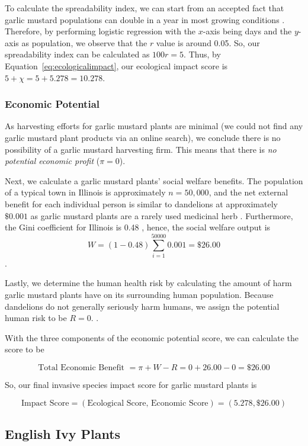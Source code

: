 To calculate the spreadability index, we can start from an accepted fact that garlic mustard populations can double in a year in most growing conditions \cite{fmrInvasiveSpecies}. Therefore, by performing logistic regression with the $x$-axis being days and the \(y\)-axis as population, we observe that the \(r\) value is around 0.05. So, our spreadability index can be calculated as \(100r = 5\). Thus, by Equation~\ref{eq:ecologicalimpact}, our ecological impact score is \(5 + \chi = 5 + 5.278 = 10.278\).

\subsubsection{Economic Potential}

As harvesting efforts for garlic mustard plants are minimal (we could not find any garlic mustard plant products via an online search), we conclude there is no possibility of a garlic mustard harvesting firm. This means that there is \textit{no potential economic profit} (\(\pi = 0\)).

Next, we calculate a garlic mustard plants' social welfare benefits. The population of a typical town in Illinois is approximately \(n = 50,000\), and the net external benefit for each individual person is similar to dandelions at approximately \(\$0.001\) as garlic mustard plants are a rarely used medicinal herb \cite{fmrInvasiveSpecies}. Furthermore, the Gini coefficient for Illinois is 0.48 \cite{247wallstIncomeInequality}, hence, the social welfare output is \[W = (1- 0.48) \sum_{i = 1}^{50000} 0.001 = \$26.00\].

Lastly, we determine the human health risk by calculating the amount of harm garlic mustard plants have on its surrounding human population. Because dandelions do not generally seriously harm humans, we assign the potential human risk to be \(R = 0\).
\cite{fmrInvasiveSpecies}.

With the three components of the economic potential score, we can calculate the score to be 

\[\text{Total Economic Benefit } = \pi + W - R = 0 + 26.00 - 0 = \$26.00\]

So, our final invasive species impact score for garlic mustard plants is

\[\text{Impact Score} = (\text{Ecological Score, Economic Score}) = (5.278, \$26.00)\]

\subsection{English Ivy Plants}

